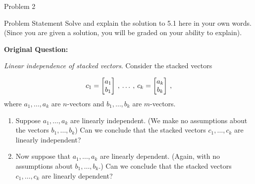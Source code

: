 \begin{problem}{Problem 2}
    \begin{statement}{Problem Statement}
        Solve and explain the solution to 5.1 here in your own words. (Since you are given a solution, you will be graded on your ability to explain). \vspace*{1em}

        \textbf{Original Question:} \vspace*{1em}

        \textit{Linear independence of stacked vectors}. Consider the stacked vectors

        \begin{equation*}
            c_{1} = 
            \begin{bmatrix}
                a_{1} \\
                b_{1} \\
            \end{bmatrix}
            \hspace*{2pt} , \hspace*{2pt} \dots \hspace*{2pt} , \hspace*{2pt}
            c_{k} =
            \begin{bmatrix}
                a_{k} \\
                b_{k} \\
            \end{bmatrix}
            \hspace*{2pt} ,
        \end{equation*}
        where $a_{1}, \dots , a_{k}$ are $n$-vectors and $b_{1}, \dots , b_{k}$ are $m$-vectors.

        \begin{enumerate}[label = (\alph*)]
            \item Suppose $a_{1}, \dots , a_{k}$ are linearly independent. (We make no assumptions about the vectors $b_{1}, \dots , b_{k}$) Can we conclude that the stacked vectors $c_{1}, \dots , c_{k}$ 
            are linearly independent?
            \item Now suppose that $a_{1}, \dots , a_{k}$ are linearly dependent. (Again, with no assumptions about $b_{1}, \dots, b_{k}$.) Can we conclude that the stacked vectors $c_{1}, \dots , c_{k}$
            are linearly dependent?
        \end{enumerate}
    \end{statement}


\end{problem}
